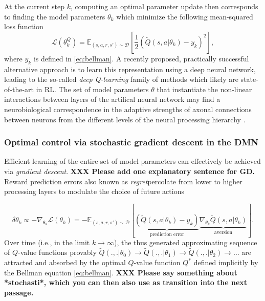 \documentclass[10pt,letterpaper]{article}
\begin{document}
At the current step $k$, computing an optimal parameter update then corresponds to
finding the model parameters $\theta_{k}$ which minimize the following mean-squared loss function
\begin{equation}
  \mathcal L(\theta^Q_{k})
  = \mathbb E_{(s, a, r, s') \sim \mathcal D}\left[\frac{1}{2}(\tilde{Q}(s, a|\theta_{k}) - y_k)^2\right],
  \label{eq:oracle}
\end{equation}
where $y_k$ is defined in \eqref{eq:bellman}.
A recently proposed, practically successful alternative approach
\citep{mnih2015,silver2016mastering} is to learn this
representation using a deep neural network, leading to the
so-called \textit{deep Q-learning} family of methods which
likely are state-of-the-art in RL.
The set of model parameters $\theta$ that instantiate the non-linear interactions
between layers of the artifical neural network
may find a neurobiological correspondence in the adaptive strengths of axonal
connections between neurons from the different levels
of the neural processing hierarchy
\citep{mesulam1998sensation, taylor2015global}.


\subsubsection{Optimal control via stochastic gradient descent in the DMN}
Efficient learning of the entire set of model parameters can effectively be achieved
via \textit{gradient descent}.
\textbf{XXX Please add one explanatory sentence for GD.}
Reward prediction errors \textemdash also known as \textit{regret}\textemdash percolate
from lower to higher processing layers to modulate the choice of future actions


\begin{equation}
  \delta \theta_{k} \propto -\nabla_{\theta_{k}}\mathcal L(\theta_{k})
  = -\mathbb E_{(s, a, r, s') \sim \mathcal D}[\underbrace{(\tilde{Q}(s, a|\theta_{k}) - y_k)}_{\text{prediction error}}
    \underbrace{\nabla_{\theta_{k}}\tilde{Q}(s, a|\theta_{k})}_{\text{aversion}}].
  \label{eq:oracle}
\end{equation}
Over time (i.e., in the limit $k \rightarrow \infty$),
the thus generated approximating sequence of
$Q$-value functions provably
$\tilde{Q}(.,.|\theta_0) \rightarrow \tilde{Q}(.,.|\theta_1) \rightarrow \tilde{Q}(.,.|\theta_2) \rightarrow \ldots$
are attracted and absorbed by the optimal $Q$-value function $Q^*$ defined implicitly by the Bellman equation \eqref{eq:bellman}.
\textbf{XXX Please say something about *stochasti*, which you can then
also use as transition into the next passage.}
\end{document}
